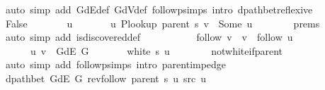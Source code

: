 \begin{isabellebody}
\ {\isacharparenleft}{\kern0pt}auto\ simp\ add{\isacharcolon}{\kern0pt}\ G{\isachardot}{\kern0pt}dE{\isacharunderscore}{\kern0pt}def\ G{\isachardot}{\kern0pt}dV{\isacharunderscore}{\kern0pt}def\ follow{\isacharunderscore}{\kern0pt}psimps\ intro{\isacharcolon}{\kern0pt}\ dpath{\isacharunderscore}{\kern0pt}bet{\isacharunderscore}{\kern0pt}reflexive{\isacharparenright}{\kern0pt}\isanewline
\ \ \isamarkupfalse%
\isanewline
\ \ \ \ \isamarkupfalse%
\ False\isanewline
\ \ \ \ \isamarkupfalse%
\ \isamarkupfalse%
\ u\ \isanewline
\ \ \ \ \ \ u{\isacharcolon}{\kern0pt}\ {\isachardoublequoteopen}P{\isacharunderscore}{\kern0pt}lookup\ {\isacharparenleft}{\kern0pt}parent\ s{\isacharparenright}{\kern0pt}\ v\ {\isacharequal}{\kern0pt}\ Some\ u{\isachardoublequoteclose}\isanewline
\ \ \ \ \ \ \isamarkupfalse%
\ {\isachardoublequoteopen}{}{\isachardot}{\kern0pt}prems{\isachardoublequoteclose}\isanewline
\ \ \ \ \ \ \isamarkupfalse%
\ {\isacharparenleft}{\kern0pt}auto\ simp\ add{\isacharcolon}{\kern0pt}\ is{\isacharunderscore}{\kern0pt}discovered{\isacharunderscore}{\kern0pt}def{\isacharparenright}{\kern0pt}\isanewline
\ \ \ \ \isamarkupfalse%
\isanewline
\ \ \ \ \ \ {\isachardoublequoteopen}follow\ v\ {\isacharequal}{\kern0pt}\ v\ {\isacharhash}{\kern0pt}\ follow\ u{\isachardoublequoteclose}\isanewline
\ \ \ \ \ \ {\isachardoublequoteopen}{\isacharparenleft}{\kern0pt}u{\isacharcomma}{\kern0pt}\ v{\isacharparenright}{\kern0pt}\ {\isasymin}\ G{\isachardot}{\kern0pt}dE\ G{\isachardoublequoteclose}\isanewline
\ \ \ \ \ \ {\isachardoublequoteopen}{\isasymnot}\ white\ s\ u{\isachardoublequoteclose}\isanewline
\ \ \ \ \ \ \isamarkupfalse%
\ not{\isacharunderscore}{\kern0pt}white{\isacharunderscore}{\kern0pt}if{\isacharunderscore}{\kern0pt}parent\isanewline
\ \ \ \ \ \ \isamarkupfalse%
\ {\isacharparenleft}{\kern0pt}auto\ simp\ add{\isacharcolon}{\kern0pt}\ follow{\isacharunderscore}{\kern0pt}psimps\ intro{\isacharcolon}{\kern0pt}\ parent{\isacharunderscore}{\kern0pt}imp{\isacharunderscore}{\kern0pt}edge{\isacharparenright}{\kern0pt}\isanewline
\ \ \ \ \isamarkupfalse%
\ \isamarkupfalse%
\ {\isachardoublequoteopen}dpath{\isacharunderscore}{\kern0pt}bet\ {\isacharparenleft}{\kern0pt}G{\isachardot}{\kern0pt}dE\ G{\isacharparenright}{\kern0pt}\ {\isacharparenleft}{\kern0pt}rev{\isacharunderscore}{\kern0pt}follow\ {\isacharparenleft}{\kern0pt}parent\ s{\isacharparenright}{\kern0pt}\ u{\isacharparenright}{\kern0pt}\ src\ u{\isachardoublequoteclose}\isanewline

\end{isabellebody}
